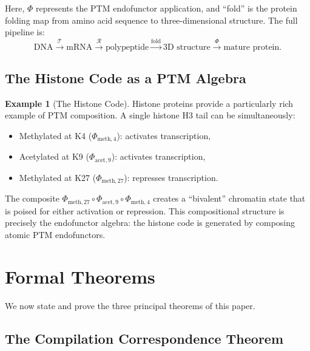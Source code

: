 \documentclass[12pt,a4paper]{article}
\theoremstyle{definition}
\newtheorem{example}[theorem]{Example}
\begin{document}
Here, $\Phi$ represents the PTM endofunctor application, and ``fold'' is the protein folding map from amino acid sequence to three-dimensional structure. The full pipeline is:
\[
  \text{DNA} \xrightarrow{\mathcal{T}} \text{mRNA} \xrightarrow{\mathcal{R}} \text{polypeptide} \xrightarrow{\text{fold}} \text{3D structure} \xrightarrow{\Phi} \text{mature protein}.
\]

\subsection{The Histone Code as a PTM Algebra}

\begin{example}[The Histone Code]\label{ex:histone-code}
Histone proteins provide a particularly rich example of PTM composition. A single histone H3 tail can be simultaneously:
\begin{itemize}
  \item Methylated at K4 ($\Phi_{\mathrm{meth},4}$): activates transcription,
  \item Acetylated at K9 ($\Phi_{\mathrm{acet},9}$): activates transcription,
  \item Methylated at K27 ($\Phi_{\mathrm{meth},27}$): represses transcription.
\end{itemize}
The composite $\Phi_{\mathrm{meth},27} \circ \Phi_{\mathrm{acet},9} \circ \Phi_{\mathrm{meth},4}$ creates a ``bivalent'' chromatin state that is poised for either activation or repression. This compositional structure is precisely the endofunctor algebra: the histone code is generated by composing atomic PTM endofunctors.
\end{example}


\section{Formal Theorems}\label{sec:theorems}

We now state and prove the three principal theorems of this paper.

\subsection{The Compilation Correspondence Theorem}
\end{document}
